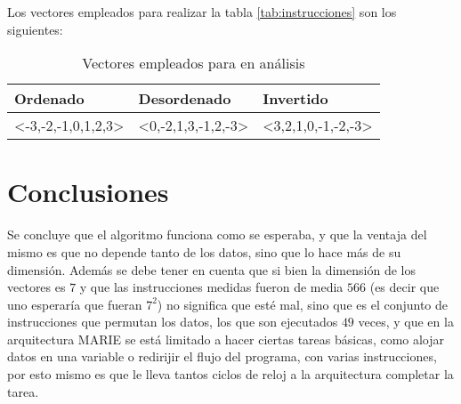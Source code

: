 \documentclass[letterpaper, 10 pt, conference]{ieeeconf}  %
\begin{document}
Los vectores empleados para realizar la tabla \ref{tab:instrucciones} son los siguientes:

\begin{table}[H]
  \centering
  \begin{tabular}{|l|l|l|}
    \hline
    Ordenado                                & Desordenado                             & Invertido                               \\ \hline
    \textless-3,-2,-1,0,1,2,3\textgreater   & \textless0,-2,1,3,-1,2,-3\textgreater   & \textless3,2,1,0,-1,-2,-3\textgreater   \\ \hline
  \end{tabular}
  \caption{Vectores empleados para en análisis}
  \label{tab:vectores}
\end{table}

\section{Conclusiones}
Se concluye que el algoritmo funciona como se esperaba, y que la ventaja del mismo es que no depende tanto de los datos, sino que lo hace más de su dimensión. Además se debe tener en cuenta que si bien la dimensión de los vectores es $7$ y que las instrucciones medidas fueron de media $566$ (es decir que uno esperaría que fueran $7^{2}$) no significa que esté mal, sino que es el conjunto de instrucciones que permutan los datos, los que son ejecutados $49$ veces, y que en la arquitectura MARIE se está limitado a hacer ciertas tareas básicas, como alojar datos en una variable o redirijir el flujo del programa, con varias instrucciones, por esto mismo es que le lleva tantos ciclos de reloj a la arquitectura completar la tarea.
\end{document}
